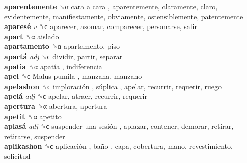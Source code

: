 \textbf{aparentemente} ␝α   cara a cara , aparentemente, claramente, claro, evidentemente, manifiestamente, obviamente, ostensiblemente, patentemente  \\
\textbf{aparesé} \emph{v}  ␝ϲ  aparecer, asomar, comparecer, personarse, salir  \\
\textbf{apart} ␝α  aislado  \\
\textbf{apartamento} ␝α  apartamento, piso  \\
\textbf{apartá} \emph{adj}  ␝ϲ  dividir, partir, separar  \\
\textbf{apatia} ␝α   apatía , indiferencia  \\
\textbf{apel} ␝ϲ   Malus pumila , manzana, manzano  \\
\textbf{apelashon} ␝ϲ   imploración ,  súplica , apelar, recurrir, requerir, ruego  \\
\textbf{apelá} \emph{adj}  ␝ϲ  apelar, atraer, recurrir, requerir  \\
\textbf{apertura} ␝α  abertura, apertura  \\
\textbf{apetit} ␝α  apetito  \\
\textbf{aplasá} \emph{adj}  ␝ϲ   suspender una sesión , aplazar, contener, demorar, retirar, retirarse, suspender  \\
\textbf{aplikashon} ␝ϲ   aplicación ,  baño , capa, cobertura, mano, revestimiento, solicitud  \\
